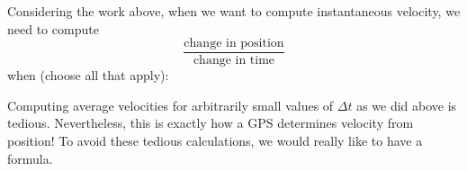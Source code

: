 \documentclass{ximera}
\begin{document}
\begin{problem}
  Considering the work above, when we want to compute instantaneous
  velocity, we need to compute
  \[
  \frac{\text{change in position}}{\text{change in time}}
  \]
  when (choose all that apply):
 \begin{selectAll}
 \end{selectAll}
\end{problem}


Computing average velocities for arbitrarily small values of
$\Delta t$ as we did above is tedious. Nevertheless, this is exactly
how a GPS determines velocity from position! To avoid these tedious
calculations, we would really like to have a formula.




%
\end{document}
